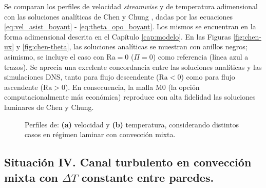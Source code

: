Se comparan los perfiles de velocidad \textit{streamwise} y de temperatura adimensional con las soluciones analíticas de Chen y Chung \cite{chen1996linear}, dadas por las ecuaciones \ref{eq:vel_asist_boyant} - \ref{eq:theta_opo_boyant}. Los mismos se encuentran en la forma adimensional descrita en el Capítulo \ref{cap:modelo}. En las Figuras \ref{fig:chen-ux} y \ref{fig:chen-theta}, las soluciones analíticas se muestran con anillos negros; asimismo, se incluye el caso con $\text{Ra}=0$ ($\Pi=0$) como referencia (línea azul a trazos). Se aprecia una excelente concordancia entre las soluciones analíticas y las simulaciones DNS, tanto para flujo descendente ($\text{Ra}<0$) como para flujo ascendente ($\text{Ra}>0$). En consecuencia, la malla M0 (la opción computacionalmente más económica) reproduce con alta fidelidad las soluciones laminares de Chen y Chung. 

\begin{figure}[H]
 \centering
 \caption{Perfiles de: \textbf{(a)} velocidad y \textbf{(b)} temperatura, considerando distintos casos en régimen laminar con convección mixta.} 
 \label{fig:chen-profiles}
\end{figure}


\subsection{Situación IV. Canal turbulento en convección mixta con $\Delta T$ constante entre paredes.}


